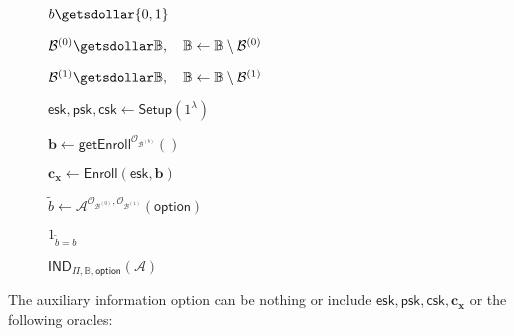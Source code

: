 \begin{figure}[h]
\centering

	\begin{minipage}[t]{0.55\textwidth}
	\begin{algorithm}[H]
	\caption{$\textsf{IND}_{\Pi, \mathbb{B}, \textsf{option}}(\mathcal{A})$}
	\label{alg:ind_game}
	\begin{algorithmic}[1]
		\State $b \getsdollar \{0, 1\}$

		\State $\mathcal{B}^{(0)} \getsdollar \mathbb{B}, \quad \mathbb{B} \gets \mathbb{B} \setminus \mathcal{B}^{(0)}$

		\State $\mathcal{B}^{(1)} \getsdollar \mathbb{B}, \quad \mathbb{B} \gets \mathbb{B} \setminus \mathcal{B}^{(1)}$

		\State $\textsf{esk}, \textsf{psk}, \textsf{csk} \gets \textsf{Setup}(1^\lambda)$

		\State $\mathbf{b} \gets \textsf{getEnroll}^{\mathcal{O}_{\mathcal{B}^{(b)}}}()$

		\State $\mathbf{c_x} \gets \textsf{Enroll}(\textsf{esk}, \mathbf{b})$


		


		

		
			\State $\tilde{b} \gets \mathcal{A}^{\mathcal{O}_{\mathcal{B}^{(0)}}, \mathcal{O}_{\mathcal{B}^{(1)}}} ( \textsf{option} )$

		\State \Return $1_{\tilde{b} = b}$
	\end{algorithmic}
	\end{algorithm}
	\end{minipage}

\label{fig:ind_game}
\end{figure}

The auxiliary information \textsf{option} can be nothing or include $\textsf{esk}, \textsf{psk}, \textsf{csk}, \mathbf{c_x} $ or the following oracles:


